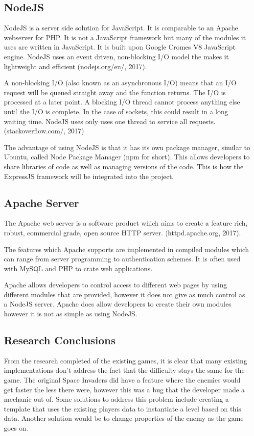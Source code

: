 \documentclass[12pt]{article}
\begin{document}
{\centering \subsection{NodeJS}}
NodeJS is a server side solution for JavaScript. It is comparable to an Apache webserver for PHP. It is not a JavaScript framework but many of the modules it uses are written in JavaScript. It is built upon Google Cromes V8 JavaScript engine. NodeJS uses an event driven, non-blocking I/O model the makes it lightweight and efficient (nodejs.org/en/, 2017).

A non-blocking I/O (also known as an asynchronous I/O) means that an I/O request will be queued straight away and the function returns. The I/O is processed at a later point. A blocking I/O thread cannot process anything else until the I/O is complete. In the case of sockets, this could result in a long waiting time. NodeJS uses only uses one thread to service all requests. (stackoverflow.com/, 2017)

The advantage of using NodeJS is that it has its own package manager, similar to Ubuntu, called Node Package Manager (npm for short). This allows developers to share libraries of code as well as managing versions of the code. This is how the ExpressJS framework will be integrated into the project.

{\centering \subsection{Apache Server}}
The Apache web server is a software product which aims to create a feature rich, robust, commercial grade, open source HTTP server. (httpd.apache.org, 2017). 

The features which Apache supports are implemented in compiled modules which can range from server programming to authentication schemes. It is often used with MySQL and PHP to crate web applications.

Apache allows developers to control access to different web pages by using different modules that are provided, however it does not give as much control as a NodeJS server. Apache does allow developers to create their own modules however it is not as simple as using NodeJS.

{\centering \subsection{Research Conclusions}}
From the research completed of the existing games, it is clear that many existing implementations don't address the fact that the difficulty stays the same for the game. The original Space Invaders did have a feature where the enemies would get faster the less there were, however this was a bug that the developer made a mechanic out of. Some solutions to address this problem include creating a template that uses the existing players data to instantiate a level based on this data. Another solution would be to change properties of the enemy as the game goes on. 
\end{document}
